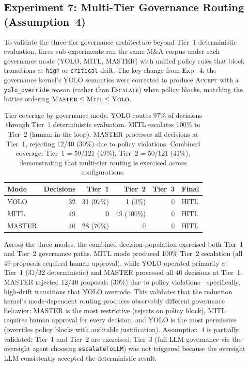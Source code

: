 \documentclass[11pt]{article}
\begin{document}
\subsection{Experiment 7: Multi-Tier Governance Routing (Assumption~4)}

To validate the three-tier governance architecture beyond Tier~1 deterministic evaluation, three sub-experiments ran the same M\&A corpus under each governance mode (YOLO, MITL, MASTER) with unified policy rules that block transitions at \texttt{high} or \texttt{critical} drift. The key change from Exp.~4: the governance kernel's YOLO semantics were corrected to produce \textsc{Accept} with a \texttt{yolo\_override} reason (rather than \textsc{Escalate}) when policy blocks, matching the lattice ordering $\textsc{Master} \leq \textsc{Mitl} \leq \textsc{Yolo}$.

\begin{table}[H]
\centering
\small
\begin{tabular}{lrrrrl}
\toprule
\textbf{Mode} & \textbf{Decisions} & \textbf{Tier~1} & \textbf{Tier~2} & \textbf{Tier~3} & \textbf{Final} \\
\midrule
YOLO   & 32 & 31 (97\%) & 1 (3\%) & 0 & HITL \\
MITL   & 49 & 0 & 49 (100\%) & 0 & HITL \\
MASTER & 40 & 28 (70\%) & 0 & 0 & HITL \\
\bottomrule
\end{tabular}
\caption{Tier coverage by governance mode. YOLO routes 97\% of decisions through Tier~1 deterministic evaluation. MITL escalates 100\% to Tier~2 (human-in-the-loop). MASTER processes all decisions at Tier~1, rejecting 12/40 (30\%) due to policy violations. Combined coverage: Tier~1 = 59/121 (49\%), Tier~2 = 50/121 (41\%), demonstrating that multi-tier routing is exercised across configurations.}
\label{tab:exp7-tiers}
\end{table}

Across the three modes, the combined decision population exercised both Tier~1 and Tier~2 governance paths. MITL mode produced 100\% Tier~2 escalation (all 49 proposals required human approval), while YOLO operated primarily at Tier~1 (31/32 deterministic) and MASTER processed all 40 decisions at Tier~1. MASTER rejected 12/40 proposals (30\%) due to policy violations---specifically, high-drift transitions that YOLO overrode. This validates that the reduction kernel's mode-dependent routing produces observably different governance behavior: MASTER is the most restrictive (rejects on policy block), MITL requires human approval for every decision, and YOLO is the most permissive (overrides policy blocks with auditable justification). Assumption~4 is partially validated: Tier~1 and Tier~2 are exercised; Tier~3 (full LLM governance via the oversight agent choosing \texttt{escalateToLLM}) was not triggered because the oversight LLM consistently accepted the deterministic result.
\end{document}

